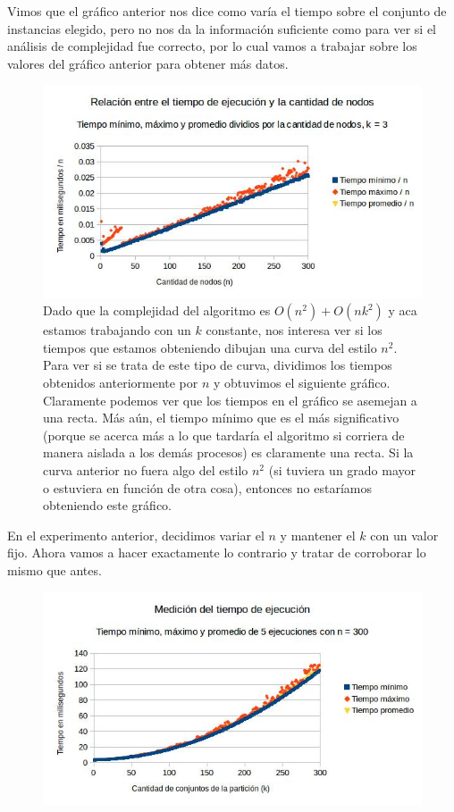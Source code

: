 \documentclass[a4paper]{article}
\begin{document}
Vimos que el gráfico anterior nos dice como varía el tiempo sobre el conjunto de instancias elegido, pero no nos da la información suficiente como para ver si el análisis de complejidad fue correcto, por lo cual vamos a trabajar sobre los valores del gráfico anterior para obtener más datos.

\begin{figure}[h]
\centering
\includegraphics[scale=0.7]{graficostiempohgolosa/tiempokfijo2.jpg}\caption{Dado que la complejidad del algoritmo es $O(n^2) + O(nk^2)$ y aca estamos trabajando con un $k$ constante, nos interesa ver si los tiempos que estamos obteniendo dibujan una curva del estilo $n^2$. Para ver si se trata de este tipo de curva, dividimos los tiempos obtenidos anteriormente por $n$ y obtuvimos el siguiente gráfico. Claramente podemos ver que los tiempos en el gráfico se asemejan a una recta. Más aún, el tiempo mínimo que es el más significativo (porque se acerca más a lo que tardaría el algoritmo si corriera de manera aislada a los demás procesos) es claramente una recta. Si la curva anterior no fuera algo del estilo $n^2$ (si tuviera un grado mayor o estuviera en función de otra cosa), entonces no estaríamos obteniendo este gráfico.}
\end{figure}

\pagebreak
En el experimento anterior, decidimos variar el $n$ y mantener el $k$ con un valor fijo. Ahora vamos a hacer exactamente lo contrario y tratar de corroborar lo mismo que antes.
\begin{figure}[h!]
\centering
\includegraphics[scale=0.7]{graficostiempohgolosa/tiemponfijo.jpg}
\end{figure}
\end{document}
